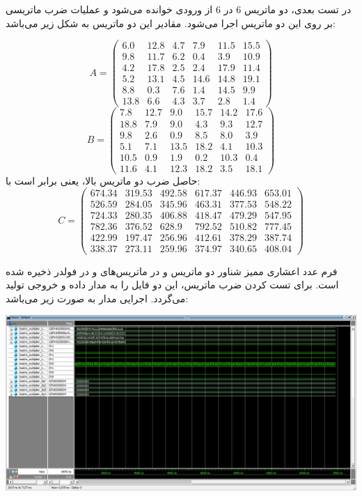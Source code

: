 \documentclass[12pt,titlepage,a4page , tikz , multi,table , svgnames,xcdraw]{article}
\begin{document}
در تست بعدی، دو ماتریس 6 در 6 از ورودی خوانده می‌شود و عملیات ضرب ماتریسی بر روی این دو ماتریس اجرا می‌شود. مقادیر این دو ماتریس به شکل زیر می‌باشد:

$$ A = \left( \begin{matrix} 6.0 & 12.8 & 4.7 & 7.9 & 11.5 & 15.5 \\ 9.8 & 11.7 & 6.2 & 0.4 & 3.9 & 10.9 \\ 4.2 & 17.8 & 2.5 & 2.4 & 17.9 & 11.4 \\ 5.2 & 13.1 & 4.5 & 14.6 & 14.8 & 19.1 \\ 8.8 & 0.3 & 7.6 & 1.4 & 14.5 & 9.9 \\ 13.8 & 6.6 & 4.3 & 3.7 & 2.8 & 1.4 \end{matrix} \right) $$
$$ B = \left( \begin{matrix} 7.8 & 12.7 & 9.0 & 15.7 & 14.2 & 17.6 \\ 18.8 & 7.9 & 9.0 & 4.3 & 9.3 & 12.7 \\ 9.8 & 2.6 & 0.9 & 8.5 & 8.0 & 3.9 \\ 5.1 & 7.1 & 13.5 & 18.2 & 4.1 & 10.3 \\ 10.5 & 0.9 & 1.9 & 0.2 & 10.3 & 0.4 \\ 11.6 & 4.1 & 12.3 & 18.2 & 3.5 & 18.1 \end{matrix} \right) $$
حاصل ضرب  دو ماتریس بالا، یعنی 
برابر است با:
$$ C = \left( \begin{matrix} 674.34 & 319.53 & 492.58 & 617.37 & 446.93 & 653.01 \\ 526.59 & 284.05 & 345.96 & 463.31 & 377.53 & 548.22 \\ 724.33 & 280.35 & 406.88 & 418.47 & 479.29 & 547.95 \\ 782.36 & 376.52 & 628.9 & 792.52 & 510.82 & 777.45 \\ 422.99 & 197.47 & 256.96 & 412.61 & 378.29 & 387.74 \\ 338.37 & 273.11 & 259.96 & 374.97 & 340.65 & 408.04 \end{matrix} \right) $$

فرم عدد اعشاری ممیز شناور دو ماتریس
و
در ماتریس‌های 
و 
در فولدر 
ذخیره شده است. برای تست کردن ضرب ماتریس، این دو فایل را به مدار داده و خروجی تولید می‌گردد. 
اجرایی مدار به صورت زیر می‌باشد:
\begin{center}
\includegraphics[scale=0.46]
    {Images/Test Bench/matrix_multiplier_waveform_2.png} \\
\end{center}
\end{document}
